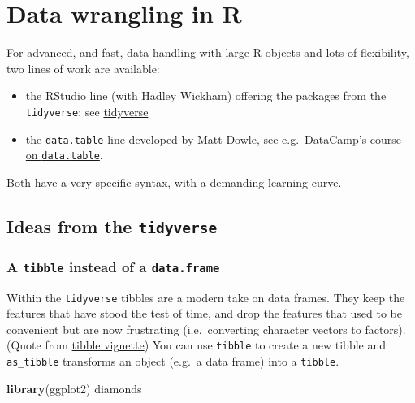 \documentclass[
]{book}
\newenvironment{Shaded}{\begin{snugshade}}{\end{snugshade}}
\newcommand{\KeywordTok}[1]{\textcolor[rgb]{0.13,0.29,0.53}{\textbf{#1}}}
\newcommand{\NormalTok}[1]{#1}
\providecommand{\tightlist}{%
  \setlength{\itemsep}{0pt}\setlength{\parskip}{0pt}}
\begin{document}
\hypertarget{data-wrangling}{%
\chapter{Data wrangling in R}\label{data-wrangling}}

For advanced, and fast, data handling with large R objects and lots of flexibility, two lines of work are available:

\begin{itemize}
\tightlist
\item
  the RStudio line (with Hadley Wickham) offering the packages from the \texttt{tidyverse}: see \href{https://www.tidyverse.org/}{tidyverse}
\item
  the \texttt{data.table} line developed by Matt Dowle, see e.g.~\href{https://www.datacamp.com/courses/data-table-data-manipulation-r-tutorial}{DataCamp's course on \texttt{data.table}}.
\end{itemize}

Both have a very specific syntax, with a demanding learning curve.

\hypertarget{ideas-from-the-tidyverse}{%
\section{\texorpdfstring{Ideas from the \texttt{tidyverse}}{Ideas from the tidyverse}}\label{ideas-from-the-tidyverse}}

\hypertarget{a-tibble-instead-of-a-data.frame}{%
\subsection{\texorpdfstring{A \texttt{tibble} instead of a \texttt{data.frame}}{A tibble instead of a data.frame}}\label{a-tibble-instead-of-a-data.frame}}

Within the \texttt{tidyverse} tibbles are a modern take on data frames. They keep the features that have stood the test of time, and drop the features that used to be convenient but are now frustrating (i.e.~converting character vectors to factors). (Quote from \href{https://cran.r-project.org/web/packages/tibble/vignettes/tibble.html}{tibble vignette}) You can use \texttt{tibble} to create a new tibble and \texttt{as\_tibble} transforms an object (e.g.~a data frame) into a \texttt{tibble}.

\begin{Shaded}
\begin{Highlighting}[]
\KeywordTok{library}\NormalTok{(ggplot2)}
\NormalTok{diamonds}
\end{Highlighting}
\end{Shaded}
\end{document}
